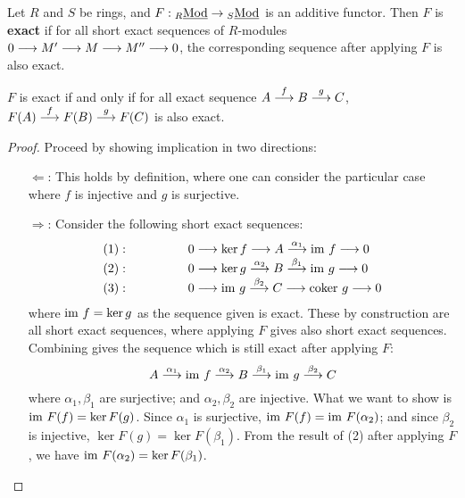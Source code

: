 \documentclass{article}
\begin{document}

\begin{definition}
    Let $R$ and $S$ be rings, and $F: {}_{R}\underline{\textup{Mod}} \to {}_{S}\underline{\textup{Mod}}$ is an additive functor. Then $F$ is \textbf{exact} if for all short exact sequences of $R$-modules $0 \longrightarrow M' \longrightarrow M \longrightarrow M'' \longrightarrow 0$, the corresponding sequence after applying $F$ is also exact.
\end{definition}

\begin{proposition}
    $F$ is exact if and only if for all exact sequence $A \overset{f}{\longrightarrow} B \overset{g}{\longrightarrow} C$, $F(A) \overset{f}{\longrightarrow} F(B) \overset{g}{\longrightarrow} F(C)$ is also exact.
\end{proposition}

\begin{proof}
    Proceed by showing implication in two directions:
    \begin{itemize}
        \item[$\Leftarrow$:] This holds by definition, where one can consider the particular case where $f$ is injective and $g$ is surjective.
        \item[$\Rightarrow$:] Consider the following short exact sequences:
        \[
        \begin{array}{ll}
            (1):\qquad\qquad & 0 \longrightarrow \ker f \longrightarrow A \overset{\alpha_1}{\longrightarrow} \mathrm{im}\  f \longrightarrow 0 \\
            (2):\qquad\qquad & 0 \longrightarrow \ker g \overset{\alpha_2}{\longrightarrow} B \overset{\beta_1}{\longrightarrow} \mathrm{im}\  g \longrightarrow 0 \\
            (3):\qquad\qquad & 0 \longrightarrow \mathrm{im}\  g \overset{\beta_2}{\longrightarrow} C \longrightarrow \mathrm{coker}\  g \longrightarrow 0
        \end{array}
        \]
        where $\mathrm{im}\  f = \ker g$ as the sequence given is exact. These by construction are all short exact sequences, where applying $F$ gives also short exact sequences. Combining gives the sequence which is still exact after applying $F$:
        \[
            A \overset{\alpha_1}{\longrightarrow} \mathrm{im}\  f \overset{\alpha_2}{\longrightarrow} B \overset{\beta_1}{\longrightarrow} \mathrm{im}\  g \overset{\beta_2}{\longrightarrow} C
        \]
        where $\alpha_1, \beta_1$ are surjective; and $\alpha_2, \beta_2$ are injective. What we want to show is $\mathrm{im}\  F(f) = \ker F(g)$. Since $\alpha_1$ is surjective, $\mathrm{im}\  F(f) = \mathrm{im}\  F(\alpha_2)$; and since $\beta_2$ is injective, $\ker F(g) = \ker F(\beta_1)$. From the result of (2) after applying $F$, we have $\mathrm{im}\  F(\alpha_2) = \ker F(\beta_1)$.
    \end{itemize}
\end{proof}
\end{document}
